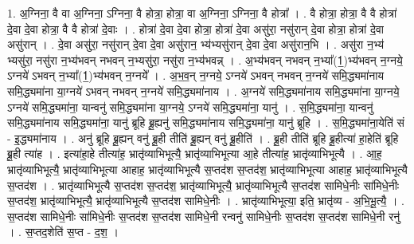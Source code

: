 \documentclass[17pt]{extarticle}
\begin{document}
1. अ॒ग्निना॒ वै वा अ॒ग्निना॒ ऽग्निना॒ वै होत्रा॒ होत्रा॒ वा अ॒ग्निना॒ ऽग्निना॒ वै होत्रा᳚ । . वै होत्रा॒ होत्रा॒ वै वै होत्रा॑ दे॒वा दे॒वा होत्रा॒ वै वै होत्रा॑ दे॒वाः । . होत्रा॑ दे॒वा दे॒वा होत्रा॒ होत्रा॑ दे॒वा असु॑रा॒ नसु॑रान् दे॒वा होत्रा॒ होत्रा॑ दे॒वा असु॑रान् । . दे॒वा असु॑रा॒ नसु॑रान् दे॒वा दे॒वा असु॑रान॒ भ्य॑भ्यसु॑रान् दे॒वा दे॒वा असु॑रान॒भि । . असु॑रा न॒भ्य॑ भ्यसु॑रा॒ नसु॑रा न॒भ्य॑भवन् नभवन् न॒भ्यसु॑रा॒ नसु॑रा न॒भ्य॑भवन्न् । . अ॒भ्य॑भवन् नभवन् न॒भ्या᳚(1॒)भ्य॑भवन् न॒ग्नये॒ ऽग्नये॑ ऽभवन् न॒भ्या᳚(1॒)भ्य॑भवन् न॒ग्नये᳚ । . अ॒भ॒व॒न् न॒ग्नये॒ ऽग्नये॑ ऽभवन् नभवन् न॒ग्नये॑ समि॒द्ध्यमा॑नाय समि॒द्ध्यमा॑ना या॒ग्नये॑ ऽभवन् नभवन् न॒ग्नये॑ समि॒द्ध्यमा॑नाय । . अ॒ग्नये॑ समि॒द्ध्यमा॑नाय समि॒द्ध्यमा॑ना या॒ग्नये॒ ऽग्नये॑ समि॒द्ध्यमा॑ना॒ यान्वनु॑ समि॒द्ध्यमा॑ना या॒ग्नये॒ ऽग्नये॑ समि॒द्ध्यमा॑ना॒ यानु॑ । . स॒मि॒द्ध्यमा॑ना॒ यान्वनु॑ समि॒द्ध्यमा॑नाय समि॒द्ध्यमा॑ना॒ यानु॑ ब्रूहि ब्रू॒ह्यनु॑ समि॒द्ध्यमा॑नाय समि॒द्ध्यमा॑ना॒ यानु॑ ब्रूहि । . स॒मि॒द्ध्यमा॑ना॒येति॑ सं - इ॒द्ध्यमा॑नाय । . अनु॑ ब्रूहि ब्रू॒ह्यन् वनु॑ ब्रू॒ही तीति॑ ब्रू॒ह्यन् वनु॑ ब्रू॒हीति॑ । . ब्रू॒ही तीति॑ ब्रूहि ब्रू॒हीत्या॑ हा॒हेति॑ ब्रूहि ब्रू॒ही त्या॑ह । . इत्या॑हा॒हे तीत्या॑ह॒ भ्रातृ॑व्याभिभूत्यै॒ भ्रातृ॑व्याभिभूत्या आ॒हे तीत्या॑ह॒ भ्रातृ॑व्याभिभूत्यै । . आ॒ह॒ भ्रातृ॑व्याभिभूत्यै॒ भ्रातृ॑व्याभिभूत्या आहाह॒ भ्रातृ॑व्याभिभूत्यै स॒प्तद॑श स॒प्तद॑श॒ भ्रातृ॑व्याभिभूत्या आहाह॒ भ्रातृ॑व्याभिभूत्यै स॒प्तद॑श । . भ्रातृ॑व्याभिभूत्यै स॒प्तद॑श स॒प्तद॑श॒ भ्रातृ॑व्याभिभूत्यै॒ भ्रातृ॑व्याभिभूत्यै स॒प्तद॑श सामिधे॒नीः सा॑मिधे॒नीः स॒प्तद॑श॒ भ्रातृ॑व्याभिभूत्यै॒ भ्रातृ॑व्याभिभूत्यै स॒प्तद॑श सामिधे॒नीः । . भ्रातृ॑व्याभिभूत्या॒ इति॒ भ्रातृ॑व्य - अ॒भि॒भू॒त्यै॒ । . स॒प्तद॑श सामिधे॒नीः सा॑मिधे॒नीः स॒प्तद॑श स॒प्तद॑श सामिधे॒नी रन्वनु॑ सामिधे॒नीः स॒प्तद॑श स॒प्तद॑श सामिधे॒नी रनु॑ । . स॒प्तद॒शेति॑ स॒प्त - द॒श॒ । \newline
\end{document}
